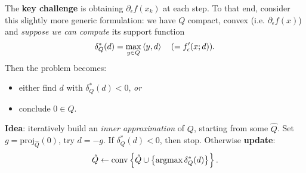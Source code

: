 The \textbf{key challenge} is obtaining $\partial_{\epsilon} f(x_k)$ at each
step. To that end, consider this slightly more generic formulation: we have $Q$
compact, convex (i.e. $\partial_{\epsilon} f(x)$) and \textit{suppose we can
compute} its support function
\[
	\delta^*_{Q}(d) = \max_{y \in Q} \left\langle y, d \right\rangle \quad (= f'_{\epsilon}(x; d)).
\]
Then the problem becomes:
\begin{itemize}
	\item either find $d$ with $\delta_Q^*(d) < 0$, \textit{or}
	\item conclude $0 \in Q$.
\end{itemize}

\noindent \textbf{Idea}: iteratively build an \textit{inner approximation} of
$Q$, starting from some $\hat{Q}$. Set $g = \mathrm{proj}_{\hat{Q}}(0)$, try $d
= -g$. If $\delta_Q^*(d) < 0$, then stop. Otherwise \textbf{update}:
\[
	\hat{Q} \gets \mathrm{conv}\left\{ \hat{Q} \cup \left\{ \operatorname*{argmax} \delta_Q^*(d) \right\} \right\}.
\]
